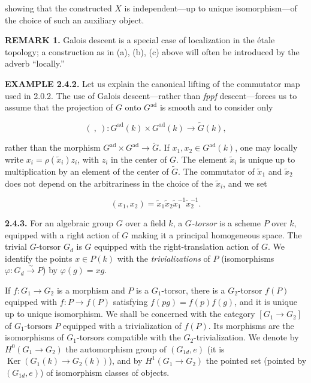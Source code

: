 \documentclass[10pt,a4paper]{article}
\newcommand{\SourcePage}[2]{\clearpage\setcounter{page}{#2}\typeout{D031_SOURCE_PAGE physical=#1 printed=#2}}
\begin{document}
\SourcePage{29}{275}
showing that the constructed \(X\) is independent---up to unique isomorphism---of the choice of such an auxiliary object.

\textbf{REMARK 1.} Galois descent is a special case of localization in the étale topology; a construction as in (a), (b), (c) above will often be introduced by the adverb ``locally.''

\textbf{EXAMPLE 2.4.2.} Let us explain the canonical lifting of the commutator map used in 2.0.2. The use of Galois descent---rather than \emph{fppf} descent---forces us to assume that the projection of \(G\) onto \(G^{\mathrm{ad}}\) is smooth and to consider only

\[
(\ ,\ ):G^{\mathrm{ad}}(k)\times G^{\mathrm{ad}}(k)\longrightarrow\widetilde G(k),
\]

rather than the morphism \(G^{\mathrm{ad}}\times G^{\mathrm{ad}}\to\widetilde G\). If \(x_1,x_2\in G^{\mathrm{ad}}(k)\), one may locally write \(x_i=\rho(\widetilde x_i)z_i\), with \(z_i\) in the center of \(G\). The element \(\widetilde x_i\) is unique up to multiplication by an element of the center of \(\widetilde G\). The commutator of \(\widetilde x_1\) and \(\widetilde x_2\) does not depend on the arbitrariness in the choice of the \(\widetilde x_i\), and we set

\[
(x_1,x_2)=\widetilde x_1\widetilde x_2\widetilde x_1^{-1}\widetilde x_2^{-1}.
\]

\textbf{2.4.3.} For an algebraic group \(G\) over a field \(k\), a \emph{\(G\)-torsor} is a scheme \(P\) over \(k\), equipped with a right action of \(G\) making it a principal homogeneous space. The trivial \(G\)-torsor \(G_d\) is \(G\) equipped with the right-translation action of \(G\). We identify the points \(x\in P(k)\) with the \emph{trivializations} of \(P\) (isomorphisms \(\varphi:G_d\xrightarrow{\sim}P\)) by \(\varphi(g)=xg\).

If \(f:G_1\to G_2\) is a morphism and \(P\) is a \(G_1\)-torsor, there is a \(G_2\)-torsor \(f(P)\) equipped with \(f:P\to f(P)\) satisfying \(f(pg)=f(p)f(g)\), and it is unique up to unique isomorphism. We shall be concerned with the category \([G_1\to G_2]\) of \(G_1\)-torsors \(P\) equipped with a trivialization of \(f(P)\). Its morphisms are the isomorphisms of \(G_1\)-torsors compatible with the \(G_2\)-trivialization. We denote by \(H^0(G_1\to G_2)\) the automorphism group of \((G_{1d},e)\) (it is \(\operatorname{Ker}(G_1(k)\to G_2(k))\)), and by \(H^1(G_1\to G_2)\) the pointed set (pointed by \((G_{1d},e)\)) of isomorphism classes of objects.
\end{document}
